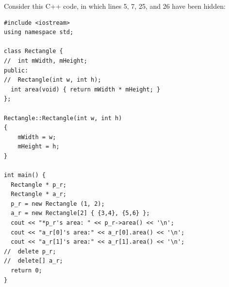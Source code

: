 \question{}

Consider this C++ code, in which lines 5, 7, 25, and 26 have been hidden:


\begin{lstlisting}
#include <iostream>
using namespace std;

class Rectangle {
//  int mWidth, mHeight;
public:
//  Rectangle(int w, int h);
  int area(void) { return mWidth * mHeight; }
};

Rectangle::Rectangle(int w, int h)
{
    mWidth = w;
    mHeight = h;
}

int main() {
  Rectangle * p_r;
  Rectangle * a_r;
  p_r = new Rectangle (1, 2);
  a_r = new Rectangle[2] { {3,4}, {5,6} };
  cout << "*p_r's area: " << p_r->area() << '\n';
  cout << "a_r[0]'s area:" << a_r[0].area() << '\n';
  cout << "a_r[1]'s area:" << a_r[1].area() << '\n';       
//  delete p_r;
//  delete[] a_r;
  return 0;
}

\end{lstlisting}

